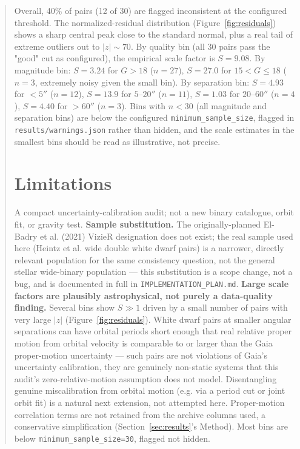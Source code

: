 \documentclass[11pt]{article}
\begin{document}
\begin{abstract}
Overall, 40\% of pairs (12 of 30) are flagged inconsistent at the configured
threshold. The normalized-residual distribution (Figure~\ref{fig:residuals})
shows a sharp central peak close to the standard normal, plus a real tail of
extreme outliers out to $|z|\sim 70$. By quality bin (all 30 pairs pass the
"good" cut as configured), the empirical scale factor is $S=9.08$. By
magnitude bin: $S=3.24$ for $G>18$ ($n=27$), $S=27.0$ for $15<G\le18$
($n=3$, extremely noisy given the small bin). By separation bin: $S=4.93$
for $<5''$ ($n=12$), $S=13.9$ for $5$--$20''$ ($n=11$), $S=1.03$ for
$20$--$60''$ ($n=4$), $S=4.40$ for $>60''$ ($n=3$). Bins with $n<30$
(all magnitude and separation bins) are below the configured
\texttt{minimum\_sample\_size}, flagged in \texttt{results/warnings.json}
rather than hidden, and the scale estimates in the smallest bins should be
read as illustrative, not precise.

\section{Limitations}
\label{sec:limitations}
A compact uncertainty-calibration audit; not a new binary catalogue, orbit
fit, or gravity test. \textbf{Sample substitution.} The originally-planned
El-Badry et al. (2021) VizieR designation does not exist; the real sample
used here (Heintz et al. wide double white dwarf pairs) is a narrower,
directly relevant population for the same consistency question, not the
general stellar wide-binary population --- this substitution is a scope
change, not a bug, and is documented in full in
\texttt{IMPLEMENTATION\_PLAN.md}. \textbf{Large scale factors are plausibly
astrophysical, not purely a data-quality finding.} Several bins show $S \gg
1$ driven by a small number of pairs with very large $|z|$
(Figure~\ref{fig:residuals}). White dwarf pairs at smaller angular
separations can have orbital periods short enough that real relative proper
motion from orbital velocity is comparable to or larger than the Gaia
proper-motion uncertainty --- such pairs are not violations of Gaia's
uncertainty calibration, they are genuinely non-static systems that this
audit's zero-relative-motion assumption does not model. Disentangling
genuine miscalibration from orbital motion (e.g. via a period cut or joint
orbit fit) is a natural next extension, not attempted here. Proper-motion
correlation terms are not retained from the archive columns used, a
conservative simplification (Section~\ref{sec:results}\allowbreak's Method).
Most bins are below \texttt{minimum\_sample\_size=30}, flagged not hidden.


\end{abstract}
\end{document}
